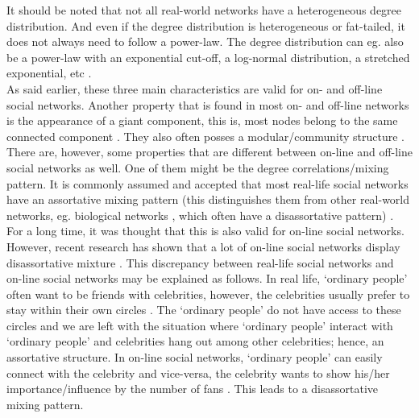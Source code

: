 \documentclass[11 pt , letterpaper , twoside , openright]{book}
\begin{document}
\newline
It should be noted that not all real-world networks have a heterogeneous degree distribution. And even if the degree distribution is heterogeneous or fat-tailed, it does not always need to follow a power-law. The degree distribution can eg. also be a power-law with an exponential cut-off, a log-normal distribution, a stretched exponential, etc \cite{Newman2005}.\\
\newline
As said earlier, these three main characteristics are valid for on- and off-line social networks. Another property that is found in most on- and off-line networks is the appearance of a giant component, this is, most nodes belong to the same connected component \cite{Latapy}. They also often posses a modular/community structure \cite{Ferrara2012}\cite{McGlohon2011}. \\
\newline
There are, however, some properties that are different between on-line and off-line social networks as well. One of them might be the degree correlations/mixing pattern. It is commonly assumed and accepted that most real-life social networks have an assortative mixing pattern (this distinguishes them from other real-world networks, eg. biological networks \cite{F.Costa2007}, which often have a disassortative pattern) \cite{Hu2009}\cite{Zhang2014}. For a long time, it was thought that this is also valid for on-line social networks. However, recent research has shown that a lot of on-line social networks display disassortative mixture \cite{Hu2009}\cite{Zhang2014}. This discrepancy between real-life social networks and on-line social networks may be explained as follows. In real life, `ordinary people' often want to be friends with celebrities, however, the celebrities usually prefer to stay within their own circles \cite{Hu2009}\cite{Zhang2014}. The `ordinary people' do not have access to these circles and we are left with the situation where `ordinary people' interact with `ordinary people' and celebrities hang out among other celebrities; hence, an assortative structure. In on-line social networks, `ordinary people' can easily connect with the celebrity and vice-versa, the celebrity wants to show his/her importance/influence by the number of fans \cite{Hu2009}\cite{Zhang2014}. This leads to a disassortative mixing pattern.
\end{document}
